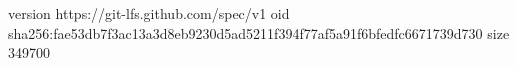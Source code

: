 version https://git-lfs.github.com/spec/v1
oid sha256:fae53db7f3ac13a3d8eb9230d5ad5211f394f77af5a91f6bfedfc6671739d730
size 349700
